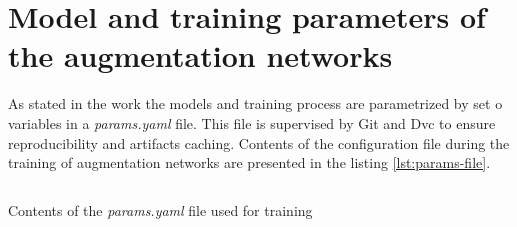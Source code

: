 \chapter{Model and training parameters of the augmentation networks}
\label{ch:appendix-params}
As stated in the work the models and training process are parametrized by set o variables in a \textit{params.yaml} file.
This file is supervised by Git and Dvc to ensure reproducibility and artifacts caching.
Contents of the configuration file during the training of augmentation networks are presented in the listing \ref{lst:params-file}.
\begin{longlisting}
\inputminted{yaml}{listings/params.yaml}
\caption{Contents of the \textit{params.yaml} file used for training}
\label{lst:params-file}
\end{longlisting}